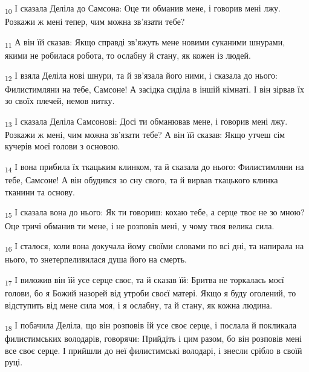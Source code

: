 \begin{tcolorbox}
\textsubscript{10} І сказала Деліла до Самсона: Оце ти обманив мене, і говорив мені лжу. Розкажи ж мені тепер, чим можна зв'язати тебе?
\end{tcolorbox}
\begin{tcolorbox}
\textsubscript{11} А він їй сказав: Якщо справді зв'яжуть мене новими суканими шнурами, якими не робилася робота, то ослабну й стану, як кожен із людей.
\end{tcolorbox}
\begin{tcolorbox}
\textsubscript{12} І взяла Деліла нові шнури, та й зв'язала його ними, і сказала до нього: Филистимляни на тебе, Самсоне! А засідка сиділа в іншій кімнаті. І він зірвав їх зо своїх плечей, немов нитку.
\end{tcolorbox}
\begin{tcolorbox}
\textsubscript{13} І сказала Деліла Самсонові: Досі ти обманював мене, і говорив мені лжу. Розкажи ж мені, чим можна зв'язати тебе? А він їй сказав: Якщо утчеш сім кучерів моєї голови з основою.
\end{tcolorbox}
\begin{tcolorbox}
\textsubscript{14} І вона прибила їх ткацьким клинком, та й сказала до нього: Филистимляни на тебе, Самсоне! А він обудився зо сну свого, та й вирвав ткацького клинка тканини та основу.
\end{tcolorbox}
\begin{tcolorbox}
\textsubscript{15} І сказала вона до нього: Як ти говориш: кохаю тебе, а серце твоє не зо мною? Оце тричі обманив ти мене, і не розповів мені, у чому твоя велика сила.
\end{tcolorbox}
\begin{tcolorbox}
\textsubscript{16} І сталося, коли вона докучала йому своїми словами по всі дні, та напирала на нього, то знетерпеливилася душа його на смерть.
\end{tcolorbox}
\begin{tcolorbox}
\textsubscript{17} І виложив він їй усе серце своє, та й сказав їй: Бритва не торкалась моєї голови, бо я Божий назорей від утроби своєї матері. Якщо я буду оголений, то відступить від мене сила моя, і я ослабну, та й стану, як кожна людина.
\end{tcolorbox}
\begin{tcolorbox}
\textsubscript{18} І побачила Деліла, що він розповів їй усе своє серце, і послала й покликала филистимських володарів, говорячи: Прийдіть і цим разом, бо він розповів мені все своє серце. І прийшли до неї филистимські володарі, і знесли срібло в своїй руці.
\end{tcolorbox}
